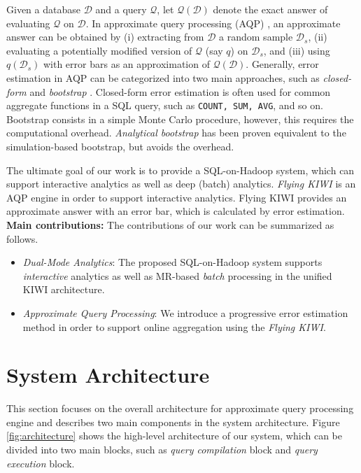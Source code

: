 \documentclass{sig-alternate-05-2015}
\newcommand{\bi}{\begin{itemize}}
\newcommand{\ei}{\end{itemize}}
\newcommand{\ii}{\item}
\begin{document}
Given a database $\mathcal{D}$ and a query $\mathcal{Q}$, let $\mathcal{Q}(\mathcal{D})$ denote the exact answer of evaluating $\mathcal{Q}$ on $\mathcal{D}$. 
In approximate query processing (AQP) \cite{Agarwal:2014, Agarwal:2013}, an approximate answer can be obtained by (i) extracting from $\mathcal{D}$ a random sample $\mathcal{D}_s$, %
(ii) evaluating a potentially modified version of $\mathcal{Q}$ (say $q$) on $\mathcal{D}_s$, and (iii) using $q(\mathcal{D}_s)$ with error bars as an approximation of $\mathcal{Q}(\mathcal{D})$.
Generally, error estimation in AQP can be categorized into two main approaches, such as \textit{closed-form} and \textit{bootstrap} \cite{Chaudhuri:2007}.
Closed-form error estimation is often used for common aggregate functions in a SQL query, such as \texttt{COUNT, SUM, AVG}, and so on. 
Bootstrap consists in a simple Monte Carlo procedure, however, this requires the computational overhead. 
\textit{Analytical bootstrap} has been proven equivalent to the simulation-based bootstrap, but avoids the overhead.%

The ultimate goal of our work is to provide a SQL-on-Hadoop system, which can support interactive analytics as well as deep (batch) analytics. \textit{Flying KIWI} is an AQP engine in order to support interactive analytics. Flying KIWI provides an approximate answer with an error bar, which is calculated by error estimation. \\

\noindent
\textbf{Main contributions:} 
The contributions of our work can be summarized as follows. 
\bi
\ii \textit{Dual-Mode Analytics}: 
The proposed SQL-on-Hadoop system supports \textit{interactive} analytics as well as MR-based \textit{batch} processing in the unified KIWI architecture.
\ii \textit{Approximate Query Processing}: 
We introduce a progressive error estimation method in order to support online aggregation using the \textit{Flying KIWI}.
\ei

\section{System Architecture}
This section focuses on the overall architecture for approximate query processing engine 
and describes two main components in the system architecture. 
Figure \ref{fig:architecture} shows the high-level architecture of our system, which can be divided into two main blocks, such as \textit{query compilation} block and \textit{query execution} block.\\
\end{document}
